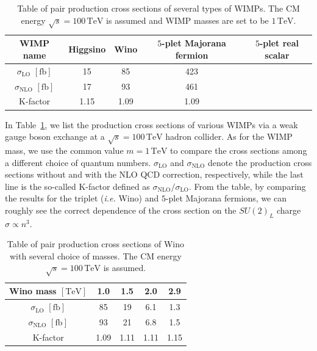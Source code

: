 \documentclass[12pt,twoside,book]{article}
\begin{document}
\begin{table}[t]
  \centering
  \begin{tabular}{c|cccc}
    WIMP name & Higgsino & Wino & $5$-plet Majorana fermion & $5$-plet real scalar \\ \hline
    $\sigma_{\mathrm{LO}}$ $[\mathrm{fb}]$ & 15 & 85 & 423 & \rem{???} \\
    $\sigma_{\mathrm{NLO}}$ $[\mathrm{fb}]$ & 17 & 93 & 461 & \rem{???} \\ \hline
    K-factor & 1.15 & 1.09 & 1.09 &
  \end{tabular}
  \caption{
    Table of pair production cross sections of several types of WIMPs.
    The CM energy $\sqrt{s} = 100\,\mathrm{TeV}$ is assumed and WIMP masses are set to be $1\,\mathrm{TeV}$.
  }
  \label{tab:cross_section_WIMPs}
\end{table}

In Table~\ref{tab:cross_section_WIMPs}, we list the production cross sections of various WIMPs via a weak gauge boson exchange at a $\sqrt{s} = 100\,\mathrm{TeV}$ hadron collider.
As for the WIMP mass, we use the common value $m = 1\,\mathrm{TeV}$ to compare the cross sections among a different choice of quantum numbers.
$\sigma_{\mathrm{LO}}$ and $\sigma_{\mathrm{NLO}}$ denote the production cross sections without and with the NLO QCD correction, respectively, while the last line is the so-called K-factor defined as $\sigma_{\mathrm{NLO}} / \sigma_{\mathrm{LO}}$.
From the table, by comparing the results for the triplet (\textit{i.e.} Wino) and $5$-plet Majorana fermions, we can roughly see the correct dependence of the cross section on the $SU(2)_L$ charge $\sigma \propto n^3$.

\begin{table}[t]
  \centering
  \begin{tabular}{c|cccc}
    Wino mass $\mathrm{[TeV]}$ & 1.0 & 1.5 & 2.0 & 2.9 \\ \hline
    $\sigma_{\mathrm{LO}}$ $[\mathrm{fb}]$ & 85 & 19 & 6.1 & 1.3\\
    $\sigma_{\mathrm{NLO}}$ $[\mathrm{fb}]$ & 93 & 21 & 6.8 & 1.5 \\ \hline
    K-factor & 1.09 & 1.11 & 1.11 & 1.15
  \end{tabular}
  \caption{
    Table of pair production cross sections of Wino with several choice of masses.
    The CM energy $\sqrt{s} = 100\,\mathrm{TeV}$ is assumed.
  }
  \label{tab:cross_section_Wino_mass}
\end{table}
\end{document}
